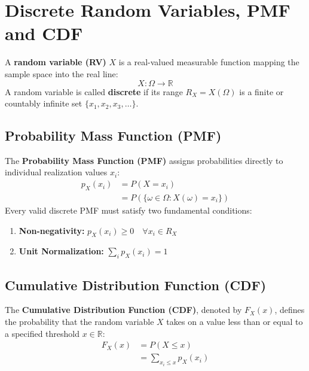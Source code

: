 \documentclass[12pt,a4paper]{article}
\begin{document}
\section{Discrete Random Variables, PMF and CDF}

\begin{tcolorbox}[defbox, title={\textbf{Definition: Discrete Random Variable}}]
A \textbf{random variable (RV)} $X$ is a real-valued measurable function mapping the sample space into the real line:
\begin{equation}
  X: \Omega \longrightarrow \mathbb{R}
\end{equation}
A random variable is called \textbf{discrete} if its range $R_X = X(\Omega)$ is a finite or countably infinite set $\{x_1, x_2, x_3, \dots\}$.
\end{tcolorbox}

\subsection{Probability Mass Function (PMF)}
The \textbf{Probability Mass Function (PMF)} assigns probabilities directly to individual realization values $x_i$:
\begin{equation}
  \begin{aligned}
    p_X(x_i) &= P(X = x_i) \\[3pt]
    &= P(\{\omega \in \Omega : X(\omega) = x_i\})
  \end{aligned}
\end{equation}
Every valid discrete PMF must satisfy two fundamental conditions:
\begin{enumerate}[leftmargin=*, itemsep=2pt]
  \item \textbf{Non-negativity:} $p_X(x_i) \ge 0 \quad \forall x_i \in R_X$
  \item \textbf{Unit Normalization:} $\sum_{i} p_X(x_i) = 1$
\end{enumerate}

\subsection{Cumulative Distribution Function (CDF)}
The \textbf{Cumulative Distribution Function (CDF)}, denoted by $F_X(x)$, defines the probability that the random variable $X$ takes on a value less than or equal to a specified threshold $x \in \mathbb{R}$:
\begin{equation}
  \begin{aligned}
    F_X(x) &= P(X \le x) \\[3pt]
    &= \sum_{x_i \le x} p_X(x_i)
  \end{aligned}
\end{equation}
\end{document}
